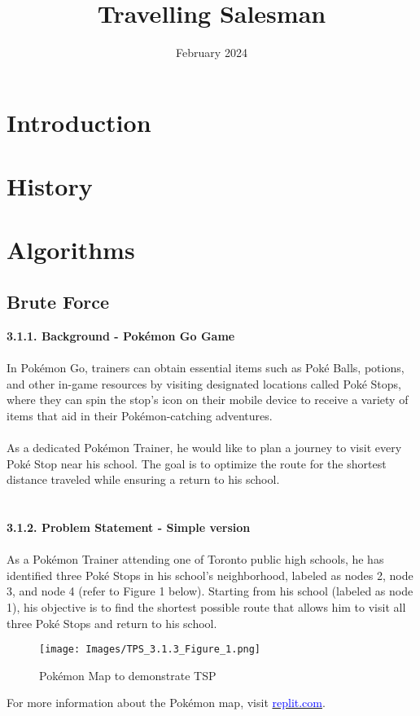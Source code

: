 \documentclass{article}
\title{Travelling Salesman}
\author{ }
\date{February 2024}
\begin{document}
\maketitle

\section{Introduction}
\section{History} %

\section{Algorithms}
\subsection{Brute Force}    %

\textbf{3.1.1. Background - Pokémon Go Game}\\
\\In Pokémon Go, trainers can obtain essential items such as Poké Balls, potions, and other in-game resources by visiting designated locations called Poké Stops, where they can spin the stop's icon on their mobile device to receive a variety of items that aid in their Pokémon-catching adventures.
\\
\\
As a dedicated Pokémon Trainer, he would like to plan a journey to visit every Poké Stop near his school. The goal is to optimize the route for the shortest distance traveled while ensuring a return to his school.\\
\\
\\
\textbf{3.1.2. Problem Statement - Simple version}
\\
\\As a Pokémon Trainer attending one of Toronto public high schools, he has identified three Poké Stops in his school's neighborhood, labeled as nodes 2, node 3, and node 4 (refer to Figure 1 below). Starting from his school (labeled as node 1), his objective is to find the shortest possible route that allows him to visit all three Poké Stops and return to his school.

\begin{figure}
    \centering
    \texttt{[image: Images/TPS\_3.1.3\_Figure\_1.png]}
    \caption{Pokémon Map to demonstrate TSP}
\end{figure}
\FloatBarrier %
For more information about the Pokémon map, visit \href{https://03054ef6-cb1d-4246-a6a2-cfd6fdae8ad3-00-1zdo2iirgfaiv.kirk.replit.dev/}{\textcolor{blue}{replit.com}}.
\\
\end{document}
